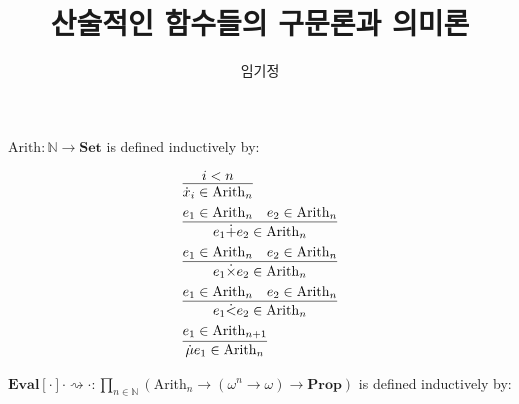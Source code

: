 \documentclass[12pt]{paper}
\title{산술적인 함수들의 구문론과 의미론}
\author{임기정}
\begin{document}
  \maketitle

  $ \mathrm{Arith} : \mathbb{N} \to \mathbf{Set} $ is defined inductively by:

  \begin{align*}
    & \infer{\dot{x}_{i} \in \mathrm{Arith}_{n}}{i < n} \\
    & \infer{e_{1} \dot{+} e_{2} \in \mathrm{Arith}_{n}}{e_{1} \in \mathrm{Arith}_{n} & e_{2} \in \mathrm{Arith}_{n}} \\
    & \infer{e_{1} \dot{\times} e_{2} \in \mathrm{Arith}_{n}}{e_{1} \in \mathrm{Arith}_{n} & e_{2} \in \mathrm{Arith}_{n}} \\
    & \infer{e_{1} \dot{<} e_{2} \in \mathrm{Arith}_{n}}{e_{1} \in \mathrm{Arith}_{n} & e_{2} \in \mathrm{Arith}_{n}} \\
    & \infer{\dot{\mu} e_{1} \in \mathrm{Arith}_{n}}{e_{1} \in \mathrm{Arith}_{n + 1}} \\
  \end{align*}

  $ \mathbf{Eval} \left[ \cdot \right] \cdot \rightsquigarrow \cdot : \prod_{n \in \mathbb{N}} \left( \mathrm{Arith}_{n} \to \left( \omega^{n} \to \omega \right) \to \mathbf{Prop} \right) $ is defined inductively by:
\end{document}
